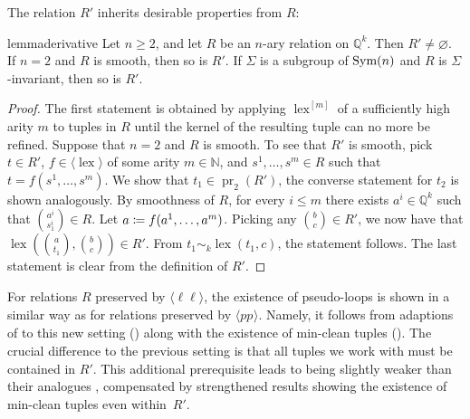 \documentclass[a4paper,reqno, cleveref]{amsart}
\newcommand{\coloneqq}{\mathrel{\mathop:}\mathrel{\mkern-1.2mu}=}
\newcommand{\N}{\mathbb{N}}
\newcommand{\Q}{\mathbb{Q}}
\DeclareMathOperator{\pr}{pr}
\DeclareMathOperator{\lex}{lex}
\newcommand{\pp}[1]{pp_{#1}}
\newcommand{\nested}[2]{{#1^{[#2]}}}
\newcommand{\gen}[1]{\langle#1\rangle}
\begin{document}
The relation $R'$
inherits desirable properties from $R$: 


\begin{restatable}{lemma}{derivative}\label{lemma:derivative}
   Let $n \geq 2$, and let $R$ be an $n$-ary relation on $\Q^k$. Then $R'\neq \varnothing$. 
    If $n=2$ and $R$ is smooth, then so is $R'$. If $\Sigma$ is a subgroup of $\textnormal{Sym}(n)$ and  $R$ is $\Sigma$-invariant, then so is  $R'$.
\end{restatable}
\begin{proof}
    The first statement is obtained by applying $\nested{\lex}{m}$ of a sufficiently high arity $m$ to tuples in $R$ until the kernel of the resulting tuple can no more be refined. Suppose that $n=2$ and $R$ is smooth. To see that $R'$ is smooth, pick $t\in R'$,  
    $f \in \gen{\lex}$ of some arity $m \in \N$, and $s^1, \dots, s^m \in R$ 
    such that $t=f(s^1, \dots, s^m).$ We show that $t_1 \in \pr_2(R')$, the converse statement for $t_2$ is shown analogously.
    By smoothness of $R$, for every $i\leq m$ there exists $a^i \in \Q^k$ such that $\binom{a^i}{s^i_1}\in R$. Let $a\coloneqq f(a^1, \dots, a^m)$. Picking any $\binom{b}{c}\in R'$, we now have that $\lex(\binom{a}{t_1},\binom{b}{c})\in R'$. From $t_1\sim_k \lex(t_1,c)$, the statement follows. The last statement is clear from the definition of $R'$.
\end{proof}

For relations $R$ preserved by $\gen{\ell\ell}$, the existence of pseudo-loops is shown in a similar way as for relations preserved by $\gen{\pp{}}$.
%
Namely, it follows from adaptions of  to this new setting () along with the existence of min-clean tuples (). 
%
The crucial difference to the previous setting is that all tuples we work with must be contained in $R'$. 
This additional prerequisite leads to  being slightly weaker than their analogues , compensated by strengthened results showing the existence of min-clean tuples even within~$R'$.
\end{document}
